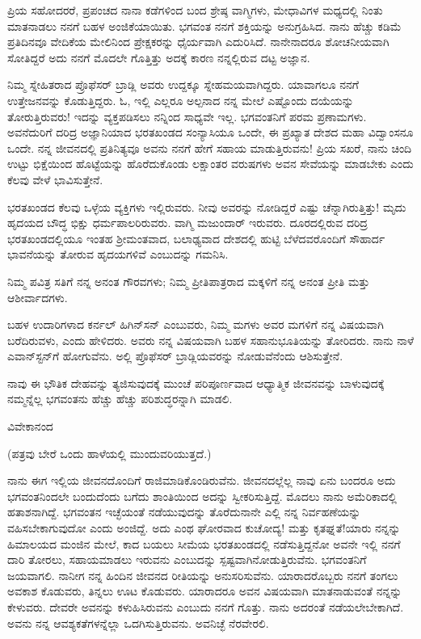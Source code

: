 ಪ್ರಿಯ ಸಹೋದರರೆ, ಪ್ರಪಂಚದ ನಾನಾ ಕಡೆಗಳಿಂದ ಬಂದ ಶ್ರೇಷ್ಠ ವಾಗ್ಮಿಗಳು, ಮೇಧಾವಿಗಳ ಮಧ್ಯದಲ್ಲಿ ನಿಂತು ಮಾತನಾಡಲು ನನಗೆ ಬಹಳ ಅಂಜಿಕೆಯಾಯಿತು. ಭಗವಂತ ನನಗೆ ಶಕ್ತಿಯನ್ನು ಅನುಗ್ರಹಿಸಿದ. ನಾನು ಹೆಚ್ಚು ಕಡಿಮೆ ಪ್ರತಿದಿನವೂ ವೇದಿಕೆಯ ಮೇಲಿನಿಂದ ಪ್ರೇಕ್ಷಕರನ್ನು ಧೈರ್ಯವಾಗಿ ಎದುರಿಸಿದೆ. ನಾನೇನಾದರೂ ಶೋಚನೀಯವಾಗಿ ಸೋತಿದ್ದರೆ \enginline{-}ಅದು ನನಗೆ ಮೊದಲೇ ಗೊತ್ತಿತ್ತು\enginline{-} ಅದಕ್ಕೆ ಕಾರಣ ನನ್ನಲ್ಲಿರುವ ದಟ್ಟ ಅಜ್ಞಾನ.

ನಿಮ್ಮ ಸ್ನೇಹಿತರಾದ ಪ್ರೊಫೆಸರ್ ಬ್ರಾಡ್ಲಿ ಅವರು ಉದ್ದಕ್ಕೂ ಸ್ನೇಹಮಯವಾಗಿದ್ದರು. ಯಾವಾಗಲೂ ನನಗೆ ಉತ್ತೇಜನವನ್ನು ಕೊಡುತ್ತಿದ್ದರು. ಓ, ಇಲ್ಲಿ ಎಲ್ಲರೂ ಅಲ್ಪನಾದ ನನ್ನ ಮೇಲೆ ಎಷ್ಟೊಂದು ದಯೆಯನ್ನು ತೋರುತ್ತಿರುವರು! ಇದನ್ನು ವ್ಯಕ್ತಪಡಿಸಲು ನನ್ನಿಂದ ಸಾಧ್ಯವೇ ಇಲ್ಲ. ಭಗವಂತನಿಗೆ ಪರಮ ಪ್ರಣಾಮಗಳು. ಅವನೆದುರಿಗೆ ದರಿದ್ರ ಅಜ್ಞಾನಿಯಾದ ಭರತಖಂಡದ ಸಂನ್ಯಾಸಿಯೂ ಒಂದೇ, ಈ ಪ್ರಖ್ಯಾತ ದೇಶದ ಮಹಾ ವಿದ್ವಾಂಸನೂ ಒಂದೇ. ನನ್ನ ಜೀವನದಲ್ಲಿ ಪ್ರತಿನಿತ್ಯವೂ ಅವನು ನನಗೆ ಹೇಗೆ ಸಹಾಯ ಮಾಡುತ್ತಿರುವನು! ಪ್ರಿಯ ಸಖರೆ, ನಾನು ಚಿಂದಿ ಉಟ್ಟು ಭಿಕ್ಷೆಯಿಂದ ಹೊಟ್ಟೆಯನ್ನು ಹೊರೆದುಕೊಂಡು ಲಕ್ಷಾಂತರ ವರುಷಗಳು ಅವನ ಸೇವೆಯನ್ನು ಮಾಡಬೇಕು ಎಂದು ಕೆಲವು ವೇಳೆ ಭಾವಿಸುತ್ತೇನೆ.

ಭರತಖಂಡದ ಕೆಲವು ಒಳ್ಳೆಯ ವ್ಯಕ್ತಿಗಳು ಇಲ್ಲಿರುವರು. ನೀವು ಅವರನ್ನು ನೋಡಿದ್ದರೆ ಎಷ್ಟು ಚೆನ್ನಾಗಿರುತ್ತಿತ್ತು! ಮೃದು ಹೃದಯದ ಬೌದ್ಧ ಭಿಕ್ಷು ಧರ್ಮಪಾಲರಿರುವರು. ವಾಗ್ಮಿ ಮಜುಂದಾರ್ ಇರುವರು. ದೂರದಲ್ಲಿರುವ ದರಿದ್ರ ಭರತಖಂಡದಲ್ಲಿಯೂ ಇಂತಹ ಶ‍್ರೀಮಂತವಾದ, ಬಲಾಢ್ಯವಾದ ದೇಶದಲ್ಲಿ ಹುಟ್ಟಿ ಬೆಳೆದವರೊಂದಿಗೆ ಸೌಹಾರ್ದ ಭಾವನೆಯನ್ನು ತೋರುವ ಹೃದಯಗಳಿವೆ ಎಂಬುದನ್ನು ಗಮನಿಸಿ.

ನಿಮ್ಮ ಪವಿತ್ರ ಸತಿಗೆ ನನ್ನ ಅನಂತ ಗೌರವಗಳು; ನಿಮ್ಮ ಪ್ರೀತಿಪಾತ್ರರಾದ ಮಕ್ಕಳಿಗೆ ನನ್ನ ಅನಂತ ಪ್ರೀತಿ ಮತ್ತು ಆಶೀರ್ವಾದಗಳು.

ಬಹಳ ಉದಾರಿಗಳಾದ ಕರ್ನಲ್ ಹಿಗಿನ್‌ಸನ್ ಎಂಬುವರು, ನಿಮ್ಮ ಮಗಳು ಅವರ ಮಗಳಿಗೆ ನನ್ನ ವಿಷಯವಾಗಿ ಬರೆದಿರುವಳು, ಎಂದು ಹೇಳಿದರು. ಅವರು ನನ್ನ ವಿಷಯವಾಗಿ ಬಹಳ ಸಹಾನುಭೂತಿಯನ್ನು ತೋರಿದರು. ನಾನು ನಾಳೆ ಎವಾನ್‌ಸ್ಟನ್‌ಗೆ ಹೋಗುವೆನು. ಅಲ್ಲಿ ಪ್ರೊಫೆಸರ್‌ ಬ್ರಾಡ್ಲಿಯವರನ್ನು ನೋಡುವೆನೆಂದು ಆಶಿಸುತ್ತೇನೆ.

ನಾವು ಈ ಭೌತಿಕ ದೇಹವನ್ನು ತ್ಯಜಿಸುವುದಕ್ಕೆ ಮುಂಚೆ ಪರಿಪೂರ್ಣವಾದ ಆಧ್ಯಾತ್ಮಿಕ ಜೀವನವನ್ನು ಬಾಳುವುದಕ್ಕೆ ನಮ್ಮನ್ನೆಲ್ಲ ಭಗವಂತನು ಹೆಚ್ಚು ಹೆಚ್ಚು ಪರಿಶುದ್ಧರನ್ನಾಗಿ ಮಾಡಲಿ.

\begin{flushright}
ವಿವೇಕಾನಂದ
\end{flushright}

(ಪತ್ರವು ಬೇರೆ ಒಂದು ಹಾಳೆಯಲ್ಲಿ ಮುಂದುವರಿಯುತ್ತದೆ.)

ನಾನು ಈಗ ಇಲ್ಲಿಯ ಜೀವನದೊಂದಿಗೆ ರಾಜಿಮಾಡಿಕೊಂಡಿರುವೆನು. ಜೀವನದಲ್ಲೆಲ್ಲ ನಾವು ಏನು ಬಂದರೂ ಅದು ಭಗವಂತನಿಂದಲೇ ಬಂದುದೆಂದು ಬಗೆದು ಶಾಂತಿಯಿಂದ ಅದನ್ನು ಸ್ವೀಕರಿಸುತ್ತಿದ್ದೆ. ಮೊದಲು ನಾನು ಅಮೆರಿಕಾದಲ್ಲಿ ಹತಾಶನಾಗಿದ್ದೆ. ಭಗವಂತನ ಇಚ್ಛೆಯಂತೆ ನಡೆಯುವುದನ್ನು ತೊರೆದುನಾನೇ ಎಲ್ಲಿ ನನ್ನ ನಿರ್ವಹಣೆಯನ್ನು ವಹಿಸಬೇಕಾಗುವುದೋ ಎಂದು ಅಂಜಿದ್ದೆ. ಅದು ಎಂಥ ಘೋರವಾದ ಕುಚೋದ್ಯ! ಮತ್ತು ಕೃತಘ್ನತೆ!ಯಾರು ನನ್ನನ್ನು ಹಿಮಾಲಯದ ಮಂಜಿನ ಮೇಲೆ, ಕಾದ ಬಯಲು ಸೀಮೆಯ ಭರತಖಂಡದಲ್ಲಿ ನಡೆಸುತ್ತಿದ್ದನೋ ಅವನೇ ಇಲ್ಲಿ ನನಗೆ ದಾರಿ ತೋರಲು, ಸಹಾಯಮಾಡಲು ಇರುವನು ಎಂಬುದನ್ನು ಸ್ಪಷ್ಟವಾಗಿನೋಡುತ್ತಿರುವೆನು. ಭಗವಂತನಿಗೆ ಜಯವಾಗಲಿ. ನಾನೀಗ ನನ್ನ ಹಿಂದಿನ ಜೀವನದ ರೀತಿಯನ್ನು ಅನುಸರಿಸುವೆನು. ಯಾರಾದರೊಬ್ಬರು ನನಗೆ ತಂಗಲು ಅವಕಾಶ ಕೊಡುವರು, ತಿನ್ನಲು ಊಟ ಕೊಡುವರು. ಯಾರಾದರೂ ಅವನ ವಿಷಯವಾಗಿ ಮಾತನಾಡುವಂತೆ ನನ್ನನ್ನು ಕೇಳುವರು. ದೇವರೇ ಅವನನ್ನು ಕಳುಹಿಸಿರುವನು ಎಂಬುದು ನನಗೆ ಗೊತ್ತು. ನಾನು ಅದರಂತೆ ನಡೆಯಲೇಬೇಕಾಗಿದೆ. ಅವನು ನನ್ನ ಆವಶ್ಯಕತೆಗಳನ್ನೆಲ್ಲಾ ಒದಗಿಸುತ್ತಿರುವನು. ಅವನಿಚ್ಛೆ ನೆರವೇರಲಿ.

